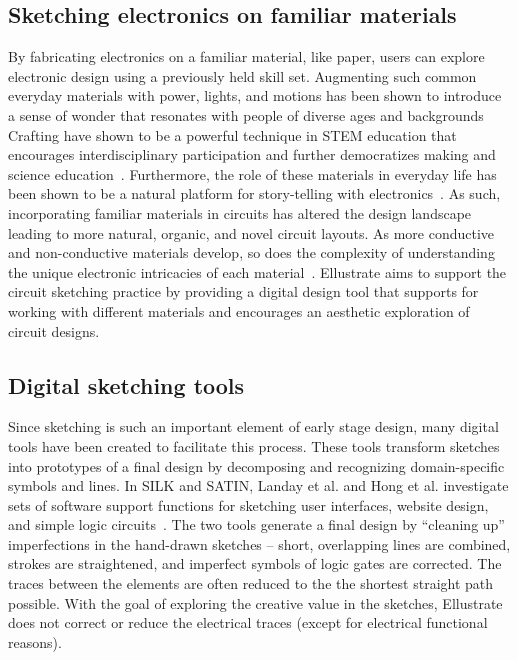 \documentclass{sigchi}
\begin{document}
\subsection{Sketching electronics on familiar materials}
By fabricating electronics on a familiar material, like paper, users can explore electronic design using a previously held skill set.  Augmenting such common everyday materials with power, lights, and motions has been shown to introduce a sense of wonder that resonates with people of diverse ages and backgrounds~\cite{karagozler_paper_2013,Qi:2010tp,qi_stickers_2015,qi_sketching_2014} Crafting have shown to be a powerful technique in STEM education that encourages interdisciplinary participation and further democratizes making and science education~\cite{qi_sketching_2014}.
Furthermore, the role of these materials in everyday life has been shown to be a natural platform for story-telling with electronics~\cite{Jacoby:2013cq}. As such, incorporating familiar materials in circuits has altered the design landscape leading to more natural, organic, and novel circuit layouts.
As more conductive and non-conductive materials develop, so does the complexity of understanding the unique electronic intricacies of each material~\cite{Hodges:2014cm}.  Ellustrate aims to support the circuit sketching practice by providing a digital design tool that supports for working with different materials and encourages an aesthetic exploration of circuit designs.




\subsection{Digital sketching tools} 
Since sketching is such an important element of early stage design, many digital tools have been created to facilitate this process. These tools transform sketches into prototypes of a final design by decomposing and recognizing domain-specific symbols and lines. In SILK and SATIN, Landay et al. and Hong et al. investigate sets of software support functions for sketching user interfaces, website design, and simple logic circuits~\cite{Hong:2007ta,Landay:1996wn}. The two tools generate a final design by ``cleaning up'' imperfections in the hand-drawn sketches -- short, overlapping lines are combined, strokes are straightened, and imperfect symbols of logic gates are corrected. The traces between the elements are often reduced to the the shortest straight path possible. With the goal of exploring the creative value in the sketches, Ellustrate does not correct or reduce the electrical traces (except for electrical functional reasons). 
\end{document}
